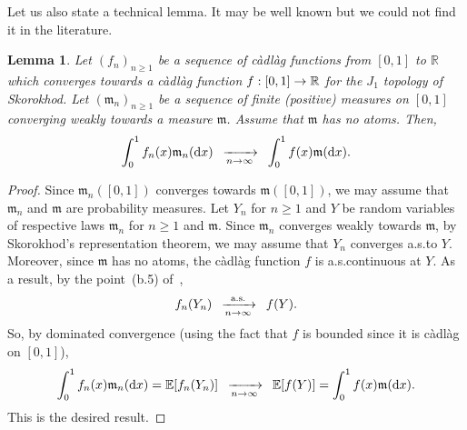 \documentclass[10pt]{amsart}
\newtheorem{lemm}[theo]{Lemma}\newtheorem{prop}[theo]{Proposition}\newtheorem{coro}[theo]{Corollary}\newtheorem{conj}[theo]{Conjecture}
\theoremstyle{definition}\newtheorem{defi}[theo]{Definition}\newtheorem{rema}[theo]{Remark}\newtheorem{exam}[theo]{Example}\newtheorem{exem}[theo]{Example}\newtheorem{nota}[theo]{Notation}
\newcommand{\cv}[1][n]{\enskip\xrightarrow[#1 \to \infty]{}\enskip}
\newcommand{\cvps}[1][n]{\enskip\xrightarrow[#1 \to \infty]{\text{a.s.}}\enskip}
\newcommand{\rmd}{\mathrm{d}}
\newcommand{\R}{\mathbb{R}}
\newcommand{\E}{\mathbb{E}}
\newcommand{\1}{\mathbbm{1}}
\newcommand{\fkm}{\mathfrak{m}}
\let\originalleft\left
\let\originalright\right
\renewcommand{\left}{\mathopen{}\mathclose\bgroup\originalleft}
\renewcommand{\right}{\aftergroup\egroup\originalright}
\renewcommand*{\to}{\mathchoice{\longrightarrow}{\rightarrow}{\rightarrow}{\rightarrow}}
\begin{document}
Let us also state a technical lemma. It may be well known but we could not find it in the literature.

\begin{lemm}\label{lemme technique cv skorokhod}
Let $(f_n)_{n\ge 1}$ be a sequence of càdlàg functions from $[0,1]$ to $\R$ which converges towards a càdlàg function $f:[0,1]\to \R$ for the $J_1$ topology of Skorokhod. Let $(\fkm_n)_{n\ge 1}$ be a sequence of finite (positive) measures on $[0,1]$ converging weakly towards a measure $\fkm$. Assume that $\fkm$ has no atoms. Then,
\[
\int_0^1 f_n(x) \fkm_n(\rmd x) \cv \int_0^1 f(x) \fkm(\rmd x).
\]
\end{lemm}
\begin{proof}
Since $\fkm_n([0,1])$ converges towards $\fkm([0,1])$, we may assume that $\fkm_n$ and $\fkm$ are probability measures. Let $Y_n$ for $n\ge 1$ and $Y$ be random variables of respective laws $\fkm_n$ for $n\ge 1$ and $\fkm$. Since $\fkm_n$ converges weakly towards $\fkm$, by Skorokhod's representation theorem, we may assume that $Y_n$ converges a.s.\@ to $Y$. Moreover, since $\fkm$ has no atoms, the càdlàg function $f$ is a.s.\@ continuous at $Y$. As a result, by the point~(b.5) of~\cite[Proposition~2.1 in Chapter~VI]{JS03},
\[
f_n(Y_n) \cvps f(Y).
\]
So, by dominated convergence (using the fact that $f$ is bounded since it is càdlàg on $[0,1]$),
\[
\int_0^1 f_n(x) \fkm_n (\rmd x) = \E\left[f_n(Y_n)\right] \cv
\E\left[f(Y)\right]= \int_0^1 f(x) \fkm(\rmd x).
\]
This is the desired result.
\end{proof}
\end{document}
